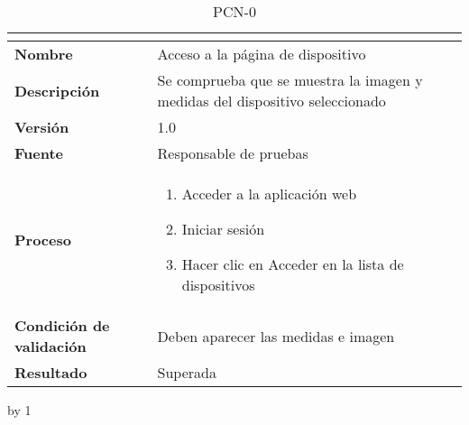 \begin{table}[H]
	\caption{PCN-0\number\pcn}
	\begin{tabular}{|l|p{}|}
		\hline
		\multicolumn{2}{|c|}{\cellcolor[HTML]{BFBFBF}{\color[HTML]{000000} \textbf{PCN-0\number\pcn}}} \\ \hline
		\textbf{Nombre}                  & Acceso a la página de dispositivo                                            \\ \hline
		\textbf{Descripción}             & Se comprueba que se muestra la imagen y medidas del dispositivo seleccionado \\ \hline
		\textbf{Versión}                 & 1.0                                                                          \\ \hline
		\textbf{Fuente}                  & Responsable de pruebas                                                       \\ \hline
		\textbf{Proceso}                 & \begin{enumerate}
			\item Acceder a la aplicación web
			\item Iniciar sesión
			\item Hacer clic en Acceder en la lista de dispositivos
		\end{enumerate}                                                   \\ \hline		
		\textbf{Condición de validación} & Deben aparecer las medidas e imagen                                          \\ \hline
		\textbf{Resultado}               & Superada                                                                     \\ \hline
	\end{tabular}
\end{table}
\advance\pcn by 1
